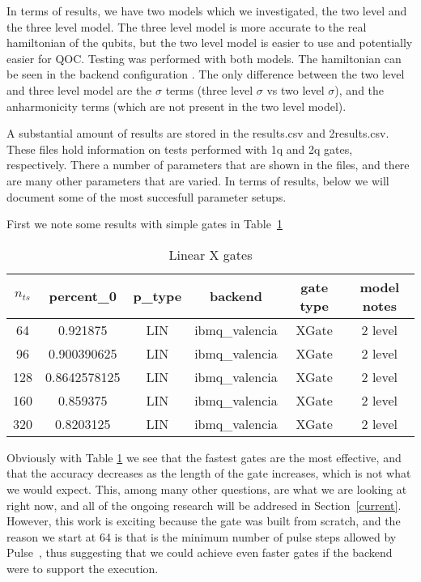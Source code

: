 \documentclass[12pt]{article}
\begin{document}
In terms of results, we have two models which we investigated, the two level and
the three level model. The three level model is more accurate to the real
hamiltonian of the qubits, but the two level model is easier to use and
potentially easier for QOC. Testing was performed with both models. The
hamiltonian can be seen in the backend configuration
\cite{alexander_qiskit_2020}. The only difference between the two level and
three level model are the $\sigma$ terms (three level $\sigma$ vs two level
$\sigma$), and the anharmonicity terms (which are not present in the two level
model).

A substantial amount of results are stored in the results.csv and 2results.csv. These files hold information on tests performed with 1q and 2q gates, respectively. There a number of parameters that are shown in the files, and there are many other parameters that are varied. In terms of results, below we will document some of the most succesfull parameter setups. 
\newline

First we note some results with simple gates in Table~\ref{table:linX}
\newline

\begin{table}
    \begin{tabular}{||c c c c c c||} 
    \hline
    $n_{ts}$ & percent\_0 & p\_type & backend & gate type & model notes\\ [0.5ex] 
    \hline
64 &0.921875 &LIN &ibmq\_valencia &XGate &2 level\\
96 &0.900390625 &LIN &ibmq\_valencia &XGate &2 level\\
128 &0.8642578125 &LIN &ibmq\_valencia &XGate &2 level\\
160 &0.859375 &LIN &ibmq\_valencia &XGate &2 level\\
320 &0.8203125 &LIN &ibmq\_valencia &XGate &2 level\\
    \hline
   \end{tabular}
   \caption{Linear X gates}
   \label{table:linX}
\end{table}

  Obviously with Table \ref{table:linX} we see that the fastest gates are the
  most effective, and that the accuracy decreases as the length of the gate
  increases, which is not what we would expect. This, among many other
  questions, are what we are looking at right now, and all of the ongoing
  research will be addresed in Section~\ref{current}. However, this work is
  exciting because the gate was built from scratch, and the reason we start at
  64 is that is the minimum number of pulse steps allowed by
  Pulse~\cite{alexander_qiskit_2020}, thus suggesting that we could achieve even
  faster gates if the backend were to support the execution.
\end{document}
